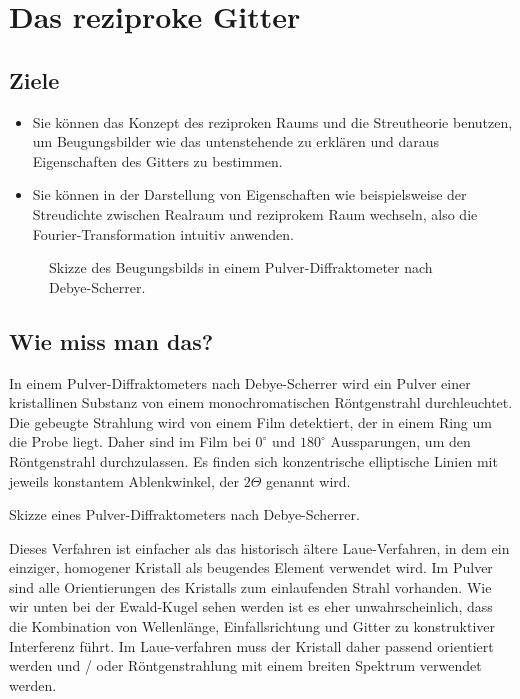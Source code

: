 \renewcommand{\chapterauthors}{Markus Lippitz}
\renewcommand{\lastmod}{17. Dezember 2021}


\chapter{Das reziproke Gitter}


\section{Ziele}

\begin{itemize}
\item Sie können das Konzept des reziproken Raums und die Streutheorie benutzen, um Beugungsbilder wie das untenstehende zu erklären und daraus Eigenschaften des Gitters zu bestimmen.

\item Sie können in der Darstellung von Eigenschaften wie beispielsweise der Streudichte zwischen Realraum und reziprokem Raum wechseln, also die Fourier-Transformation intuitiv anwenden.
\end{itemize}


\begin{figure}
  \caption{Skizze des Beugungsbilds in einem Pulver-Diffraktometer nach Debye-Scherrer.}
\end{figure}




\section{Wie miss man das?}

In einem  Pulver-Diffraktometers  nach Debye-Scherrer wird ein Pulver einer kristallinen Substanz von einem monochromatischen Röntgenstrahl durchleuchtet. Die gebeugte Strahlung wird von einem Film detektiert, der in einem Ring um die Probe liegt. Daher sind im Film bei $0^\circ$ und $180^\circ$ Aussparungen, um den Röntgenstrahl durchzulassen. Es finden sich konzentrische elliptische Linien mit jeweils konstantem Ablenkwinkel, der $2\Theta$ genannt wird.

\begin{marginfigure}
  \caption{Skizze  eines Pulver-Diffraktometers nach Debye-Scherrer.}
\end{marginfigure}

Dieses Verfahren ist einfacher als das historisch ältere Laue-Verfahren, in dem ein einziger, homogener Kristall als beugendes Element verwendet wird. Im Pulver sind alle Orientierungen  des Kristalls zum einlaufenden Strahl vorhanden. Wie wir unten bei der Ewald-Kugel sehen werden ist es eher unwahrscheinlich, dass die Kombination von Wellenlänge, Einfallsrichtung und Gitter zu konstruktiver Interferenz führt. Im Laue-verfahren muss der Kristall daher passend orientiert werden und / oder Röntgenstrahlung mit einem breiten Spektrum verwendet werden.

